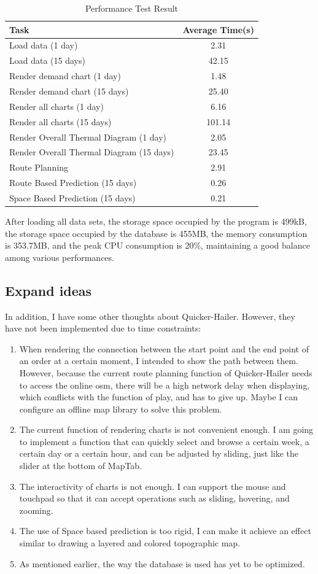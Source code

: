 \documentclass{article}
\begin{document}
\begin{table}[htbp]
	\centering
	\begin{tabular}{lc}
		\toprule
		Task	&	Average Time(s)	\\
		\midrule
		Load data (1 day)	&	2.31	\\
		Load data (15 days)	&	42.15	\\
		Render demand chart (1 day)	&	1.48	\\
		Render demand chart (15 days)	&	25.40	\\
		Render all charts (1 day)	&	6.16	\\
		Render all charts (15 days)	&	101.14	\\
		Render Overall Thermal Diagram (1 day)	&	2.05	\\
		Render Overall Thermal Diagram (15 days)	&	23.45	\\
		Route Planning	&	2.91	\\
		Route Based Prediction (15 days)	&	0.26	\\
		Space Based Prediction (15 days)	&	0.21	\\
		\bottomrule
	\end{tabular}
	\caption{Performance Test Result}
\end{table}

After loading all data sets, the storage space occupied by the program is 499kB, the storage space occupied by the database is 455MB, the memory consumption is 353.7MB, and the peak CPU consumption is 20\%, maintaining a good balance among various performances.

\subsection{Expand ideas}
In addition, I have some other thoughts about Quicker-Hailer. However, they have not been implemented due to time constraints:
\begin{enumerate}
	\item When rendering the connection between the start point and the end point of an order at a certain moment, I intended to show the path between them. However, because the current route planning function of Quicker-Hailer needs to access the online osm, there will be a high network delay when displaying, which conflicts with the function of play, and has to give up. Maybe I can configure an offline map library to solve this problem.
	\item The current function of rendering charts is not convenient enough. I am going to implement a function that can quickly select and browse a certain week, a certain day or a certain hour, and can be adjusted by sliding, just like the slider at the bottom of MapTab.
	\item The interactivity of charts is not enough. I can support the mouse and touchpad so that it can accept operations such as sliding, hovering, and zooming.
	\item The use of Space based prediction is too rigid, I can make it achieve an effect similar to drawing a layered and colored topographic map.
	\item As mentioned earlier, the way the database is used has yet to be optimized.
\end{enumerate}
\end{document}

